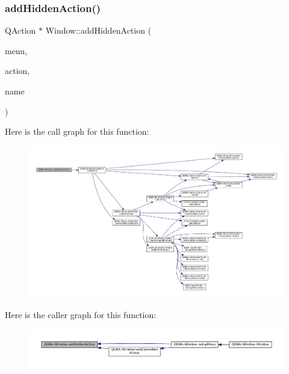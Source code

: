 \subsubsection{\texorpdfstring{add\+Hidden\+Action()}{addHiddenAction()}}
{\footnotesize\ttfamily Q\+Action $\ast$ Window\+::add\+Hidden\+Action (\begin{DoxyParamCaption}\item[{Q\+Menu $\ast$}]{menu,  }\item[{Q\+Action $\ast$}]{action,  }\item[{const Q\+String \&}]{name }\end{DoxyParamCaption})\hspace{0.3cm}{\ttfamily [private]}}

Here is the call graph for this function\+:
\nopagebreak
\begin{figure}[H]
\begin{center}
\leavevmode
\includegraphics[width=350pt]{class_q_g_b_a_1_1_window_a3ab387305397be7854469d5060e678db_cgraph}
\end{center}
\end{figure}
Here is the caller graph for this function\+:
\nopagebreak
\begin{figure}[H]
\begin{center}
\leavevmode
\includegraphics[width=350pt]{class_q_g_b_a_1_1_window_a3ab387305397be7854469d5060e678db_icgraph}
\end{center}
\end{figure}
\mbox{\label{class_q_g_b_a_1_1_window_af4bbf2742217f6075a7768fb3042ff31}} 
